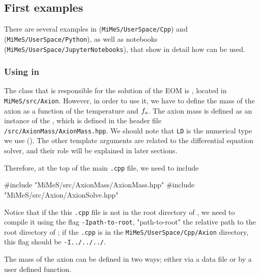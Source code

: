 \documentclass[11pt,a4paper]{article}
\begin{document}
\subsection{First examples}\label{sec:First_examples} 
%
There are several examples in \CPP ({\tt MiMeS/UserSpace/Cpp}) and \PY ({\tt MiMeS/UserSpace/Python}), as well as \JUPY  notebooks ({\tt MiMeS/UserSpace/JupyterNotebooks}), that show in detail how \mimes can be used. 

\subsubsection{Using \mimes in \CPP}\label{sec:cpp_first_example}
%
The class that is responsible for the solution of the EOM is , located in {\tt MiMeS/src/Axion}. However, in order to use it, we have to define the mass of the axion as a function of the temperature and $f_{a}{}$. The axion mass is defined as an instance of the , which is defined in the header file {\tt \mimes/src/AxionMass/AxionMass.hpp}. We should note that {\tt LD} is the numerical type we use (). The other template arguments are related to the differential equation solver, and their role will be explained in later sections. 

Therefore, at the top of the main {\tt .cpp} file, we need to include 
%
\begin{cpp}
	#include "MiMeS/src/AxionMass/AxionMass.hpp"
	#include "MiMeS/src/Axion/AxionSolve.hpp"
\end{cpp}
%
Notice that if the this {\tt .cpp} file is not in the root directory of \mimes, we need to compile it using the flag {\tt -Ipath-to-root}, "path-to-root" the relative path to the root directory of \mimes; \eg if the {\tt .cpp} is in the {\tt MiMeS/UserSpace/Cpp/Axion} directory, this flag should be {\tt -I../../../}.

The mass of the axion can be defined in two ways; either via a data file or by a user defined function. 
\end{document}

